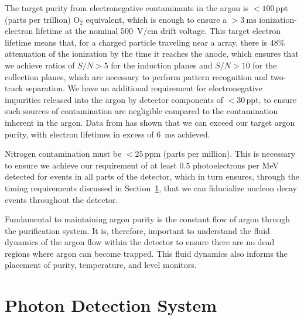 The target purity from electronegative contaminants in the argon is $<\!\!100$\,ppt (parts per trillion) O$_{2}$ equivalent, which is enough to ensure a $>\!\!\SI{3}{\milli\second}$ ionization-electron lifetime at the nominal \SI{500}{\volt/\centi\meter} drift voltage. This target electron lifetime means that, for a charged particle traveling near a  array, there is 48\% attenuation of the ionization by the time it reaches the anode, which ensures that we achieve  ratios of $S/N>5$ for the induction planes and $S/N>10$ for the collection planes, which are necessary to perform pattern recognition and two-track separation. We have an additional requirement for electronegative impurities released into the argon by detector components of $<\!30$\,ppt, to ensure such sources of contamination are negligible compared to the contamination inherent in the argon. Data from  has shown that we can exceed our target argon purity, with electron lifetimes in excess of \SI{6}{\milli\second} achieved.

Nitrogen contamination must be $<\!25$\,ppm (parts per million). This is necessary to ensure we achieve our requirement of at least 0.5 photoelectrons per MeV detected for events in all parts of the detector, which in turn ensures, through the timing requirements discussed in Section~\ref{sec:fdsp-exec-pds}, that we can fiducialize nucleon decay events throughout the detector.



Fundamental to maintaining argon purity is the constant flow of argon through the purification system. It is, therefore, important to understand the fluid dynamics of the argon flow within the detector to ensure there are no dead regions where argon can become trapped. This fluid dynamics also informs the placement of purity, temperature, and level monitors.



\section{Photon Detection System}
\label{sec:fdsp-exec-pds}

